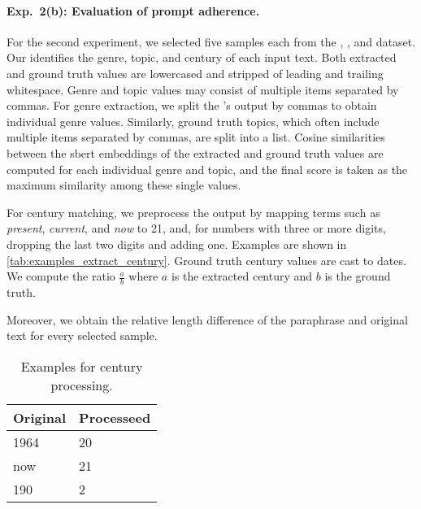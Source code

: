 \paragraph{Exp.\ 2(b): Evaluation of prompt adherence.}
For the second experiment, we selected five samples each from the \dataBlog{}, \dataGutenberg{}, and \dataStudent{} dataset. 
Our \pextractor{} identifies the genre, topic, and century of each input text. 
Both extracted and ground truth values are lowercased and stripped of leading and trailing whitespace. 
Genre and topic values may consist of multiple items separated by commas. 
For genre extraction, we split the \pextractor{}'s output by commas to obtain individual genre values. 
Similarly, ground truth topics, which often include multiple items separated by commas, are split into a list. 
Cosine similarities between the \ac{sbert} embeddings of the extracted and ground truth values are computed for each individual genre and topic, and the final score is taken as the maximum similarity among these single values. 

For century matching, we preprocess the \pextractor{} output by mapping terms such as \textit{present}, \textit{current}, and \textit{now} to 21, and, for numbers with three or more digits, dropping the last two digits and adding one. 
Examples are shown in \autoref{tab:examples_extract_century}. 
Ground truth century values are cast to dates.
We compute the ratio $\frac{a}{b}$ where $a$ is the extracted century and $b$ is the ground truth.

Moreover, we obtain the relative length difference of the paraphrase and original text for every selected sample. 

\begin{table}[h]
\centering
\caption{Examples for century processing.}
\label{tab:examples_extract_century}
\begin{tabular}{ll}
    \toprule
\textbf{Original} & \textbf{Processeed} \\
\midrule
1964              & 20                  \\
now               & 21                  \\
190               & 2     \\
\bottomrule             
\end{tabular}%
\end{table}

